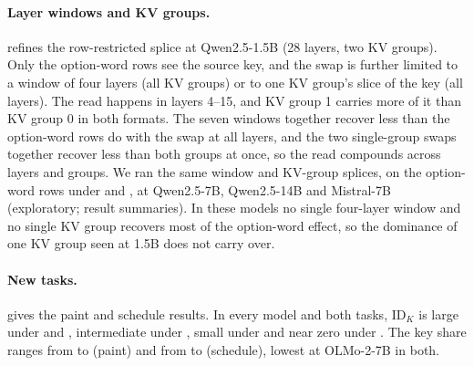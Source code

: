 \begin{table}[!ht]
\centering
\caption{\textbf{Key share by clamp onset.} $s_K = \bar d_K / (\bar d_K + \bar d_V)$ under \fmtOpt{} with both clamps applied from layer $\ell_0$ on; the onset used in each model is given in brackets. $n = 150$ stories per model; point estimates (the $\ell_0 = 0$ intervals are in \cref{tab:natural}). Exploratory.}
\label{tab:onset}

\end{table}

\paragraph{Layer windows and KV groups.}  refines the row-restricted splice at Qwen2.5-1.5B (28 layers, two KV groups). Only the option-word rows see the source key, and the swap is further limited to a window of four layers (all KV groups) or to one KV group's slice of the key (all layers). The read happens in layers 4--15, and KV group 1 carries more of it than KV group 0 in both formats. The seven windows together recover less than the option-word rows do with the swap at all layers, and the two single-group swaps together recover less than both groups at once, so the read compounds across layers and groups. We ran the same window and KV-group splices, on the option-word rows under \fmtOpt{} and \fmtLetter{}, at Qwen2.5-7B, Qwen2.5-14B and Mistral-7B (exploratory; result summaries). In these models no single four-layer window and no single KV group recovers most of the option-word effect, so the dominance of one KV group seen at 1.5B does not carry over.

\begin{table}[!ht]
\centering
\caption{\textbf{Depth and KV-group localisation of the option-word key read} (Qwen2.5-1.5B, FP32). Entries are fractions of the effect obtained when the option-word rows see the source key in every layer and both KV groups, with 95\% bootstrap CIs over stories (ratio of means recomputed in each resample). $n = 40$ stories per format. Exploratory.}
\label{tab:windows}

\end{table}

\paragraph{New tasks.}  gives the paint and schedule results. In every model and both tasks, $\mathrm{ID}_K$ is large under \fmtLetter{} and \fmtOpt{}, intermediate under \fmtPost{}, small under \fmtNone{} and near zero under \fmtBefore{}. The \fmtOpt{} key share ranges from \taskPaintShareMin{} to \taskPaintShareMax{} (paint) and from \taskScheduleShareMin{} to \taskScheduleShareMax{} (schedule), lowest at OLMo-2-7B in both.

